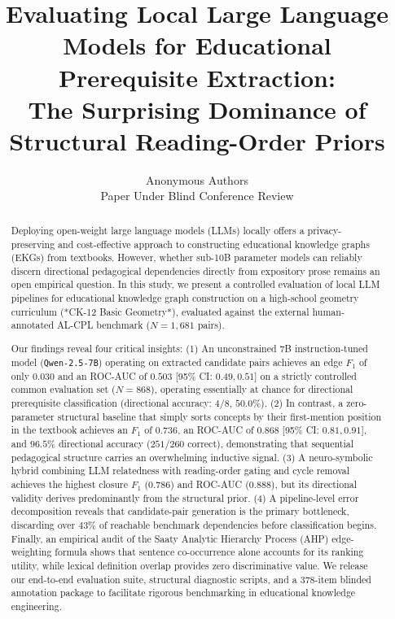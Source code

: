 \documentclass[11pt,a4paper]{article}
\title{\textbf{Evaluating Local Large Language Models for Educational Prerequisite Extraction:\\The Surprising Dominance of Structural Reading-Order Priors}}
\author{
  Anonymous Authors\\
  \small{Paper Under Blind Conference Review}
}
\date{}
\begin{document}
\maketitle

\begin{abstract}
Deploying open-weight large language models (LLMs) locally offers a privacy-preserving and cost-effective approach to constructing educational knowledge graphs (EKGs) from textbooks. However, whether sub-10B parameter models can reliably discern directional pedagogical dependencies directly from expository prose remains an open empirical question. In this study, we present a controlled evaluation of local LLM pipelines for educational knowledge graph construction on a high-school geometry curriculum (*CK-12 Basic Geometry*), evaluated against the external human-annotated AL-CPL benchmark ($N=1,681$ pairs). 

Our findings reveal four critical insights: 
(1) An unconstrained 7B instruction-tuned model (\texttt{Qwen-2.5-7B}) operating on extracted candidate pairs achieves an edge $F_1$ of only $0.030$ and an ROC-AUC of $0.503$ [95\% CI: $0.49, 0.51$] on a strictly controlled common evaluation set ($N=868$), operating essentially at chance for directional prerequisite classification (directional accuracy: $4/8$, $50.0\%$).
(2) In contrast, a zero-parameter structural baseline that simply sorts concepts by their first-mention position in the textbook achieves an $F_1$ of $0.736$, an ROC-AUC of $0.868$ [95\% CI: $0.81, 0.91$], and $96.5\%$ directional accuracy ($251/260$ correct), demonstrating that sequential pedagogical structure carries an overwhelming inductive signal.
(3) A neuro-symbolic hybrid combining LLM relatedness with reading-order gating and cycle removal achieves the highest closure $F_1$ ($0.786$) and ROC-AUC ($0.888$), but its directional validity derives predominantly from the structural prior.
(4) A pipeline-level error decomposition reveals that candidate-pair generation is the primary bottleneck, discarding over $43\%$ of reachable benchmark dependencies before classification begins. 
Finally, an empirical audit of the Saaty Analytic Hierarchy Process (AHP) edge-weighting formula shows that sentence co-occurrence alone accounts for its ranking utility, while lexical definition overlap provides zero discriminative value. We release our end-to-end evaluation suite, structural diagnostic scripts, and a 378-item blinded annotation package to facilitate rigorous benchmarking in educational knowledge engineering.
\end{abstract}
\end{document}
